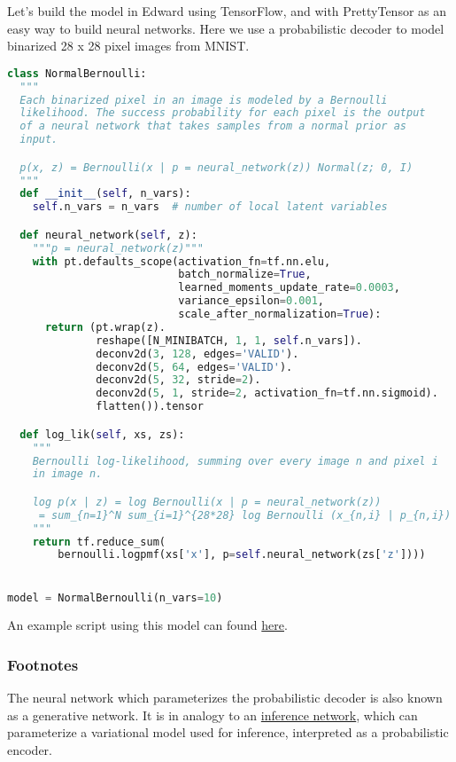 Let's build the model in Edward using TensorFlow, and with
PrettyTensor as an easy way to build neural networks. Here we use a
probabilistic decoder to model binarized 28 x 28
pixel images from MNIST.
\begin{lstlisting}[language=Python]
class NormalBernoulli:
  """
  Each binarized pixel in an image is modeled by a Bernoulli
  likelihood. The success probability for each pixel is the output
  of a neural network that takes samples from a normal prior as
  input.

  p(x, z) = Bernoulli(x | p = neural_network(z)) Normal(z; 0, I)
  """
  def __init__(self, n_vars):
    self.n_vars = n_vars  # number of local latent variables

  def neural_network(self, z):
    """p = neural_network(z)"""
    with pt.defaults_scope(activation_fn=tf.nn.elu,
                           batch_normalize=True,
                           learned_moments_update_rate=0.0003,
                           variance_epsilon=0.001,
                           scale_after_normalization=True):
      return (pt.wrap(z).
              reshape([N_MINIBATCH, 1, 1, self.n_vars]).
              deconv2d(3, 128, edges='VALID').
              deconv2d(5, 64, edges='VALID').
              deconv2d(5, 32, stride=2).
              deconv2d(5, 1, stride=2, activation_fn=tf.nn.sigmoid).
              flatten()).tensor

  def log_lik(self, xs, zs):
    """
    Bernoulli log-likelihood, summing over every image n and pixel i
    in image n.

    log p(x | z) = log Bernoulli(x | p = neural_network(z))
     = sum_{n=1}^N sum_{i=1}^{28*28} log Bernoulli (x_{n,i} | p_{n,i})
    """
    return tf.reduce_sum(
        bernoulli.logpmf(xs['x'], p=self.neural_network(zs['z'])))


model = NormalBernoulli(n_vars=10)
\end{lstlisting}

An example script using this model can found
\href{https://github.com/blei-lab/edward/blob/master/examples/tf_convolutional_vae.py}
{here}.

\subsubsection{Footnotes}

The neural network which parameterizes the probabilistic decoder is
also known as a generative network. It is in analogy to an
\href{tut_inference_networks}{inference network}, which
can parameterize a variational model used for inference,
interpreted as a probabilistic encoder.

